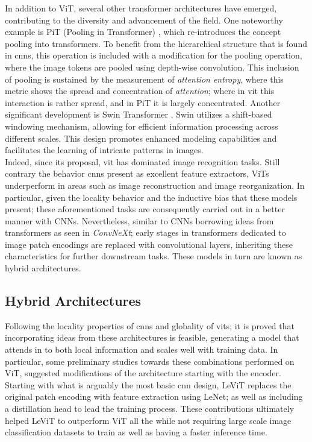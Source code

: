 \noindent In addition to ViT, several other transformer architectures have emerged, contributing to 
the diversity and advancement of the field. One noteworthy example is PiT (Pooling in Transformer) 
\autocite{heo2021rethinking}, which re-introduces the concept pooling into transformers. To benefit 
from the hierarchical structure that is found in \glspl{cnn}, this operation is included with 
a modification for the pooling operation, where the image tokens are  pooled using depth-wise 
convolution. This inclusion of pooling is sustained by the measurement of \emph{attention entropy}, 
where this metric shows the spread and concentration of \emph{attention}; where in \gls{vit} this 
interaction is rather spread, and in PiT it is largely concentrated. Another significant 
development is Swin Transformer \autocite{liu2021swin}. Swin utilizes a shift-based windowing 
mechanism, allowing for efficient information processing across different scales. This design promotes 
enhanced modeling capabilities and facilitates the learning of intricate patterns in images.\\

\noindent Indeed, since its proposal, \gls{vit} has dominated image recognition tasks. Still 
contrary the behavior \glspl{cnn} present as excellent feature extractors, ViTs underperform in 
areas such as image reconstruction and image reorganization. In particular, given the locality 
behavior and the inductive bias that these models present; these aforementioned tasks are 
consequently carried out in a better manner with CNNs. Nevertheless, similar to 
CNNs borrowing ideas from transformers as seen in \emph{ConvNeXt}; early stages in transformers 
dedicated to image patch encodings are replaced with convolutional layers, inheriting these 
characteristics for further downstream tasks. These models in turn are known as hybrid 
architectures.
\subsection{Hybrid Architectures}
\label{rel:sub_hybrid}
Following the locality properties of \glspl{cnn} and globality of \glspl{vit}; it is proved 
that incorporating ideas from these architectures is feasible, generating a model that attends in 
to both local information and scales well with training data. In particular, some 
preliminary studies towards these combinations performed on ViT, suggested modifications of the 
architecture starting with the encoder. Starting with what is arguably the most basic \gls{cnn} 
design, LeViT \autocite{graham2021levit} replaces the original patch encoding with feature 
extraction using LeNet; as well as including a distillation head to lead the training process. 
These contributions ultimately helped LeViT to outperform ViT all the while not requiring large 
scale image classification datasets to train as well as having a faster inference time.\\

